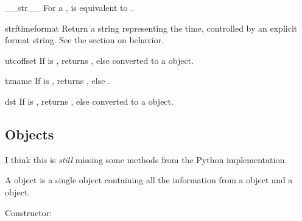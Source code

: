 \begin{methoddesc}{__str__}{}
    For a  ,  is equivalent to
    .
\end{methoddesc}

\begin{methoddesc}{strftime}{format}
    Return a string representing the time, controlled by an explicit
    format string.  See the section on  behavior.
\end{methoddesc}

\begin{methoddesc}{utcoffset}{}
    If  is , returns , else
     converted to a 
    object.
\end{methoddesc}

\begin{methoddesc}{tzname}{}
    If  is , returns , else
    .
\end{methoddesc}

\begin{methoddesc}{dst}{}
    If  is , returns , else
     converted to a  object.
\end{methoddesc}



\subsection{  Objects \label{datetime-datetimetz}}

\begin{notice}[warning]
  I think this is \emph{still} missing some methods from the
  Python implementation.
\end{notice}

A  object is a single object containing all the information
from a  object and a  object.

Constructor:

